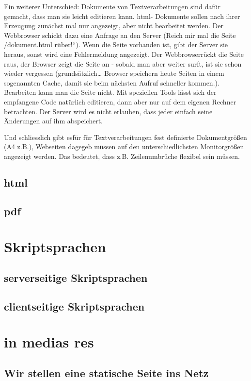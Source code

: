   Ein weiterer Unterschied: Dokumente von Textverarbeitungen sind dafür gemacht, dass man sie leicht editieren kann. html- Dokumente sollen nach ihrer Erzeugung zunächst mal nur angezeigt, aber nicht bearbeitet werden. Der Webbrowser schickt dazu eine Anfrage an den Server (\quotedblbase{}Reich mir mal die Seite /dokument.html rüber!\textquotedblleft{}). Wenn die Seite vorhanden ist, gibt der Server sie heraus, sonst wird eine Fehlermeldung angezeigt. Der Webbrowserrückt die Seite raus, der Browser zeigt die Seite an - sobald man aber weiter surft, ist sie schon wieder vergessen (grundsätzlich\ldots{} Browser speichern heute Seiten in einem sogenannten Cache, damit sie beim nächsten Aufruf schneller kommen.). Bearbeiten kann man die Seite nicht. Mit speziellen Tools lässt sich der empfangene Code natürlich editieren, dann aber nur auf dem eigenen Rechner betrachten. Der Server wird es nicht erlauben, dass jeder einfach seine Änderungen auf ihm abspeichert.

  Und schliesslich gibt esfür für Textverarbeitungen fest definierte Dokumentgrößen (A4 z.B.), Webseiten dagegeb müssen auf den unterschiedlichsten Monitorgrößen angezeigt werden. Das bedeutet, dass z.B. Zeilenumbrüche flexibel sein müssen.

  
  \subsection{html}
  \subsection{pdf}


\section{Skriptsprachen}
  \subsection{serverseitige Skriptsprachen}
  \subsection{clientseitige Skriptsprachen}

\section{in medias res}
  \subsection{Wir stellen eine statische Seite ins Netz}
